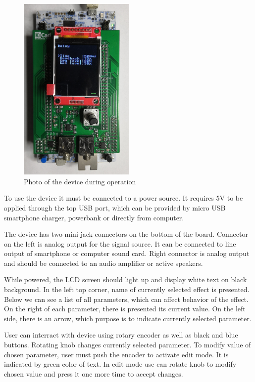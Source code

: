 \documentclass[a4paper,twoside,12pt]{book}
\begin{document}
\begin{figure}[H]
    \centering
    \includegraphics[width=0.5\textwidth]{images/photo_working}
    \caption{Photo of the device during operation}
    \label{fig:working}
\end{figure}

To use the device it must be connected to a power source.
It requires 5V to be applied through the top USB port,
which can be provided by micro USB smartphone charger,
powerbank or directly from computer.

The device has two mini jack connectors on the bottom of the board.
Connector on the left is analog output for the signal source.
It can be connected to line output of smartphone or computer sound card.
Right connector is analog output and should be connected
to an audio amplifier or active speakers.

While powered, the LCD screen should light up
and display white text on black background.
In the left top corner, name of currently selected effect is presented.
Below we can see a list of all parameters,
which can affect behavior of the effect.
On the right of each parameter, there is presented its current value.
On the left side, there is an arrow,
which purpose is to indicate currently selected parameter.

User can interract with device using rotary encoder
as well as black and blue buttons.
Rotating knob changes currently selected parameter.
To modify value of chosen parameter, user must push the encoder
to activate edit mode. It is indicated by green color of text.
In edit mode use can rotate knob to modify chosen value
and press it one more time to accept changes.
\end{document}
